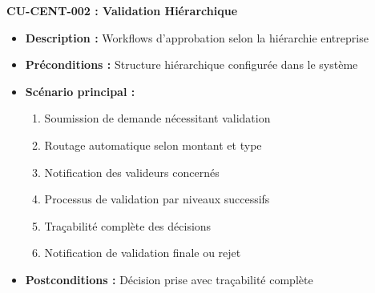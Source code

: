 \textbf{CU-CENT-002 : Validation Hiérarchique}
\begin{itemize}
    \item \textbf{Description :} Workflows d'approbation selon la hiérarchie entreprise
    \item \textbf{Préconditions :} Structure hiérarchique configurée dans le système
    \item \textbf{Scénario principal :}
    \begin{enumerate}
        \item Soumission de demande nécessitant validation
        \item Routage automatique selon montant et type
        \item Notification des valideurs concernés
        \item Processus de validation par niveaux successifs
        \item Traçabilité complète des décisions
        \item Notification de validation finale ou rejet
    \end{enumerate}
    \item \textbf{Postconditions :} Décision prise avec traçabilité complète
\end{itemize}
